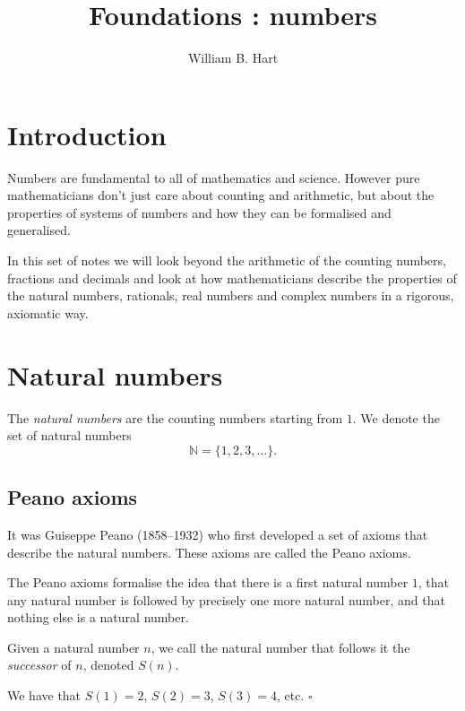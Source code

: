 \documentclass[10pt]{article}
\title{Foundations : numbers}
\author{
William B. Hart
}
\newcommand{\N}{\mathbb{N}}
\newcommand{\qed}{\square}
\newenvironment{definition}[1][Definition]{\begin{trivlist}
\item[\hskip \labelsep {\bfseries #1}]}{\end{trivlist}}
\newenvironment{example}[1][Example]{\begin{trivlist}
\item[\hskip \labelsep {\bfseries #1}]}{\end{trivlist}}
\begin{document}
\maketitle

\tableofcontents

\section{Introduction}

Numbers are fundamental to all of mathematics and science. However pure mathematicians don't just care about counting and arithmetic, but about the properties of systems of numbers and how they can be formalised and generalised.

In this set of notes we will look beyond the arithmetic of the counting numbers, fractions and decimals and look at how mathematicians describe the properties of the natural numbers, rationals, real numbers and complex numbers in a rigorous, axiomatic way.

\section{Natural numbers}

The \emph{natural numbers} are the counting numbers starting from $1$. We denote the set of natural numbers 
$$\N = \{1, 2, 3, \ldots\}.$$

\subsection{Peano axioms}

It was Guiseppe Peano (1858--1932) who first developed a set of axioms that describe the natural numbers. These axioms are called the Peano axioms.

The Peano axioms formalise the idea that there is a first natural number $1$, that any natural number is followed by precisely one more natural number, and that nothing else is a natural number.

\begin{definition}
Given a natural number $n$, we call the natural number that follows it the \emph{successor} of $n$, denoted $S(n)$.
\end{definition}

\begin{example}
We have that $S(1) = 2$, $S(2) = 3$, $S(3) = 4$, etc. $\qed$
\end{example}
\end{document}
